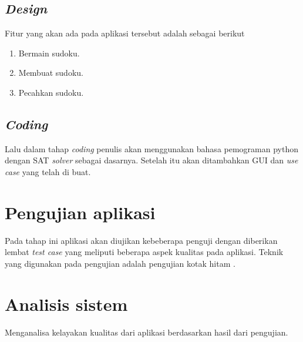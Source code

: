 \subsection{\textit{Design}}

Fitur yang akan ada pada aplikasi tersebut adalah sebagai berikut

 \begin{enumerate}
 	\item Bermain sudoku.
 	\item Membuat sudoku.
 	\item Pecahkan sudoku.
 \end{enumerate}

\subsection{\textit{Coding}}

Lalu dalam tahap \textit{coding} penulis akan menggunakan
bahasa pemograman python dengan SAT \textit{solver} \cite{SATPy2} sebagai dasarnya. Setelah itu akan ditambahkan GUI dan \textit{use case} yang telah di buat.

\section{Pengujian aplikasi}

Pada tahap ini aplikasi akan diujikan kebeberapa penguji dengan diberikan lembat \textit{test case} yang meliputi beberapa aspek kualitas pada aplikasi. Teknik yang digunakan pada pengujian adalah pengujian kotak hitam \cite{TEST1}.

\section{Analisis sistem}

Menganalisa kelayakan kualitas dari aplikasi berdasarkan hasil dari pengujian.